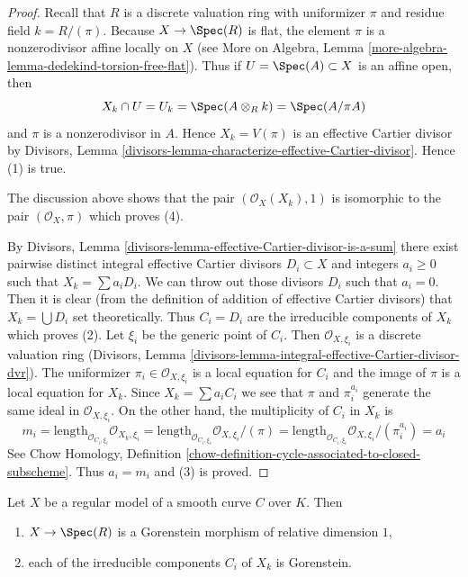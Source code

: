 \begin{proof}
Recall that $R$ is a discrete valuation ring with uniformizer $\pi$
and residue field $k = R/(\pi)$. Because $X \to \Spec(R)$ is flat,
the element $\pi$ is a nonzerodivisor affine locally on $X$
(see More on Algebra, Lemma
\ref{more-algebra-lemma-dedekind-torsion-free-flat}). Thus
if $U = \Spec(A) \subset X$ is an affine open, then
$$
X_k \cap U = U_k = \Spec(A \otimes_R k) = \Spec(A/\pi A)
$$
and $\pi$ is a nonzerodivisor in $A$.
Hence $X_k = V(\pi)$ is an effective Cartier divisor by
Divisors, Lemma \ref{divisors-lemma-characterize-effective-Cartier-divisor}.
Hence (1) is true.

\medskip\noindent
The discussion above shows that the pair $(\mathcal{O}_X(X_k), 1)$
is isomorphic to the pair $(\mathcal{O}_X, \pi)$ which proves (4).

\medskip\noindent
By Divisors, Lemma \ref{divisors-lemma-effective-Cartier-divisor-is-a-sum}
there exist pairwise distinct integral effective Cartier divisors
$D_i \subset X$ and integers $a_i \geq 0$ such that $X_k = \sum a_i D_i$.
We can throw out those divisors $D_i$ such that $a_i = 0$. Then it is
clear (from the definition of addition of effective Cartier
divisors) that $X_k = \bigcup D_i$ set theoretically. Thus $C_i = D_i$
are the irreducible components of $X_k$ which proves (2).
Let $\xi_i$ be the generic point of $C_i$.
Then $\mathcal{O}_{X, \xi_i}$ is a discrete valuation ring
(Divisors, Lemma \ref{divisors-lemma-integral-effective-Cartier-divisor-dvr}).
The uniformizer $\pi_i \in \mathcal{O}_{X, \xi_i}$ is a local equation
for $C_i$ and the image of $\pi$ is a local equation for $X_k$.
Since $X_k = \sum a_i C_i$ we see that $\pi$ and $\pi_i^{a_i}$
generate the same ideal in $\mathcal{O}_{X, \xi_i}$.
On the other hand, the multiplicity of $C_i$ in $X_k$ is
$$
m_i = \text{length}_{\mathcal{O}_{C_i, \xi_i}} \mathcal{O}_{X_k, \xi_i} =
\text{length}_{\mathcal{O}_{C_i, \xi_i}} \mathcal{O}_{X, \xi_i}/(\pi) =
\text{length}_{\mathcal{O}_{C_i, \xi_i}} \mathcal{O}_{X, \xi_i}/(\pi_i^{a_i}) =
a_i
$$
See Chow Homology, Definition
\ref{chow-definition-cycle-associated-to-closed-subscheme}.
Thus $a_i = m_i$ and (3) is proved.
\end{proof}

\begin{lemma}
\label{lemma-gorenstein}
Let $X$ be a regular model of a smooth curve $C$ over $K$. Then
\begin{enumerate}
\item $X \to \Spec(R)$ is a Gorenstein morphism of relative dimension $1$,
\item each of the irreducible components $C_i$ of $X_k$ is Gorenstein.
\end{enumerate}
\end{lemma}

